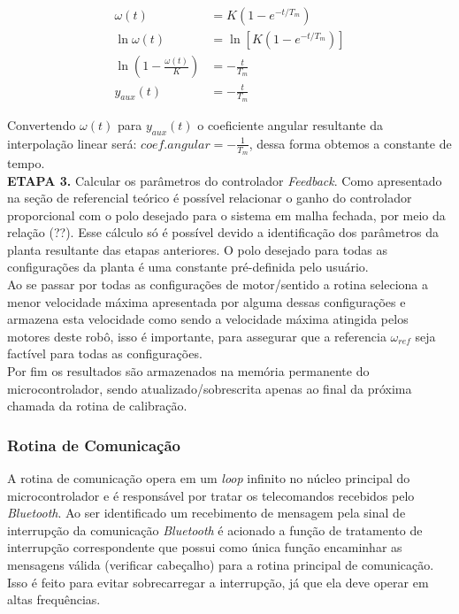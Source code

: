 \begin{align*}
    \omega(t) &= K\left( 1 - e^{-t/T_m} \right)\\
    \ln{\omega(t)} &= \ln\left[K( 1 - e^{-t/T_m})\right]\\
    \ln\left(1 - \frac{\omega(t)}{K} \right) &= -\frac{t}{T_m}\\
    y_{aux}(t) &= -\frac{t}{T_m}
\end{align*}

Convertendo $\omega(t)$ para $y_{aux}(t)$ o coeficiente angular resultante da interpolação linear será: $coef.angular = -\frac{1}{T_m}$, dessa forma obtemos a constante de tempo.\\

\textbf{ETAPA 3.} Calcular os parâmetros do controlador \textit{Feedback}. Como apresentado na seção de referencial teórico é possível relacionar o ganho do controlador proporcional com o polo desejado para o sistema em malha fechada, por meio da relação (??). Esse cálculo só é possível devido a identificação dos parâmetros da planta resultante das etapas anteriores. O polo desejado para todas as configurações da planta é uma constante pré-definida pelo usuário.\\
    

Ao se passar por todas as configurações de motor/sentido a rotina seleciona a menor velocidade máxima apresentada por alguma dessas configurações e armazena esta velocidade como sendo a velocidade máxima atingida pelos motores deste robô, isso é importante, para assegurar que a referencia $\omega_{ref}$ seja factível para todas as configurações. \\

Por fim os resultados são armazenados na memória permanente do microcontrolador, sendo atualizado/sobrescrita apenas ao final da próxima chamada da rotina de calibração.

\subsubsection{Rotina de Comunicação}
A rotina de comunicação opera em um \emph{loop} infinito no núcleo principal do microcontrolador e é responsável por tratar os telecomandos recebidos pelo \textit{Bluetooth}. Ao ser identificado um recebimento de mensagem pela sinal de interrupção da comunicação \textit{Bluetooth} é acionado a função de tratamento de interrupção correspondente que possui como única função encaminhar as mensagens válida (verificar cabeçalho) para a rotina principal de comunicação. Isso é feito para evitar sobrecarregar a interrupção, já que ela deve operar em altas frequências.\\

